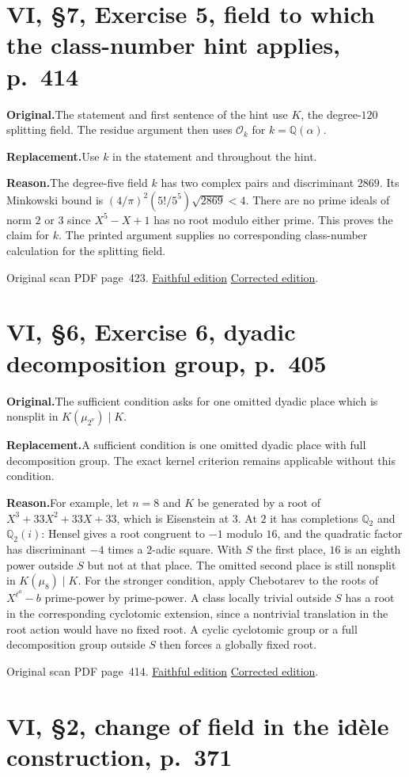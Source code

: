 \documentclass[11pt,a4paper]{article}
\newcommand{\original}{\par\smallskip\noindent\textbf{Original.}\enspace}
\newcommand{\replacement}{\par\smallskip\noindent\textbf{Replacement.}\enspace}
\newcommand{\reason}{\par\smallskip\noindent\textbf{Reason.}\enspace}
\newcommand{\editionlink}[3]{\href{#1\#errata.#2}{#3}}
\newcommand{\location}[2]{%
  \par\smallskip\noindent Original scan PDF page~#2.\enspace
  \editionlink{Neukirch_Faithful.pdf}{#1}{Faithful edition}
  \quad\editionlink{Neukirch_Corrected.pdf}{#1}{Corrected edition}.}
\begin{document}
\setcounter{section}{139}
\section{VI, \S7, Exercise 5, field to which the class-number hint applies, p.~414}\label{errata:item:140}

\original The statement and first sentence of the hint use $K$, the degree-$120$ splitting field. The residue argument then uses $\mathcal O_k$ for $k=\mathbb Q(\alpha)$.
\replacement Use $k$ in the statement and throughout the hint.
\reason The degree-five field $k$ has two complex pairs and discriminant $2869$. Its Minkowski bound is $(4/\pi)^2(5!/5^5)\sqrt{2869}<4$. There are no prime ideals of norm $2$ or $3$ since $X^5-X+1$ has no root modulo either prime. This proves the claim for $k$. The printed argument supplies no corresponding class-number calculation for the splitting field.
\location{140}{423}

\setcounter{section}{140}
\section{VI, \S6, Exercise 6, dyadic decomposition group, p.~405}\label{errata:item:141}

\original The sufficient condition asks for one omitted dyadic place which is nonsplit in $K(\mu_{2^\nu})\mid K$.
\replacement A sufficient condition is one omitted dyadic place with full decomposition group. The exact kernel criterion remains applicable without this condition.
\reason For example, let $n=8$ and $K$ be generated by a root of $X^3+33X^2+33X+33$, which is Eisenstein at $3$. At $2$ it has completions $\mathbb Q_2$ and $\mathbb Q_2(i)$: Hensel gives a root congruent to $-1$ modulo $16$, and the quadratic factor has discriminant $-4$ times a $2$-adic square. With $S$ the first place, $16$ is an eighth power outside $S$ but not at that place. The omitted second place is still nonsplit in $K(\mu_8)\mid K$. For the stronger condition, apply Chebotarev to the roots of $X^{\ell^a}-b$ prime-power by prime-power. A class locally trivial outside $S$ has a root in the corresponding cyclotomic extension, since a nontrivial translation in the root action would have no fixed root. A cyclic cyclotomic group or a full decomposition group outside $S$ then forces a globally fixed root.
\location{141}{414}

\setcounter{section}{141}
\section{VI, \S2, change of field in the idèle construction, p.~371}\label{errata:item:142}
\end{document}
